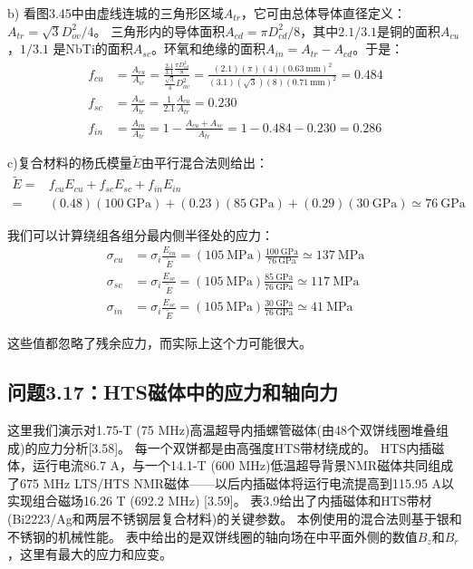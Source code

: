 b) 看图3.45中由虚线连城的三角形区域$A_{tr}$，它可由总体导体直径定义：$A_{tr} =\sqrt{3} D_{ov}^2/4$。
三角形内的导体面积$A_{cd}= \pi D_{cd}^2/8$，其中$2.1/3.1$是铜的面积$A_{cu}$，$1/3.1$
是NbTi的面积$A_{sc}$。环氧和绝缘的面积$A_{in}= A_{tr} − A_{cd}$。于是：
\begin{align*}
f_{cu}&=\frac{A_{cu}}{A_{ir}}=\frac{\frac{2.1}{3.1}\frac{\pi D_{cd}^{2}}{8}}{\frac{\sqrt{3}}{4}D_{ov}^{2}}=\frac{(2.1)(\pi)(4)(0.63\ \mathrm{mm})^{2}}{(3.1)(\sqrt{3})(8)(0.71\ \mathrm{mm})^{2}}=0.484\tag{S16.3a}\\
f_{sc}&=\frac{A_{sc}}{A_{tr}}=\frac{1}{2.1}\frac{A_{cu}}{A_{tr}}=0.230 \tag{S16.3b}\\
f_{in}&=\frac{A_{in}}{A_{tr}}=1-\frac{A_{cu}+A_{sc}}{A_{tr}}=1-0.484-0.230=0.286 \tag{S16.3c}
\end{align*}

c)复合材料的杨氏模量$\tilde{E}$由平行混合法则给出：
\begin{equation*}
\begin{split}
\tilde{E}=&f_{cu}E_{cu}+f_{sc}E_{sc}+f_{in}E_{in}\\
=&(0.48)(100\ \mathrm{GPa})+(0.23)(85\ \mathrm{GPa})+(0.29)(30 \ \mathrm{GPa})
\simeq 76\ \mathrm{GPa}
\end{split}\tag{S16.4}
\end{equation*}

我们可以计算绕组各组分最内侧半径处的应力：
\begin{align*}
\sigma_{cu}&=\sigma_{i}\frac{E_{cu}}{\tilde{E}}=(105\ \mathrm{MPa})\frac{100\ \mathrm{GPa}}{76\ \mathrm{GPa}}\simeq 137\ \mathrm{MPa} \tag{S16.5a}\\%
\sigma_{sc}&=\sigma_{i}\frac{E_{sc}}{\tilde{E}}=(105\ \mathrm{MPa})\frac{85\ \mathrm{GPa}}{76\ \mathrm{GPa}}\simeq 117\ \mathrm{MPa}\tag{S16.5b}\\%
\sigma_{in}&=\sigma_{i}\frac{E_{sc}}{\tilde{E}}=(105\ \mathrm{MPa})\frac{30\ \mathrm{GPa}}{76\ \mathrm{GPa}}\simeq 41\ \mathrm{MPa}\tag{S16.5c} %
\end{align*}

这些值都忽略了残余应力，而实际上这个力可能很大。


\subsection{问题3.17：HTS磁体中的应力和轴向力}
这里我们演示对1.75-T (75 MHz)高温超导内插螺管磁体(由48个双饼线圈堆叠组成)的应力分析[3.58]。
每一个双饼都是由高强度HTS带材绕成的。
HTS内插磁体，运行电流86.7 A，与一个14.1-T (600 MHz)低温超导背景NMR磁体共同组成了675 MHz LTS/HTS
NMR磁体——以后内插磁体将运行电流提高到115.95 A以实现组合磁场16.26 T (692.2 MHz) [3.59]。
表3.9给出了内插磁体和HTS带材(Bi2223/Ag和两层不锈钢层复合材料)的关键参数。 
本例使用的混合法则基于银和不锈钢的机械性能。
表中给出的是双饼线圈的轴向场在中平面外侧的数值$B_z$和$B_r$，这里有最大的应力和应变。

